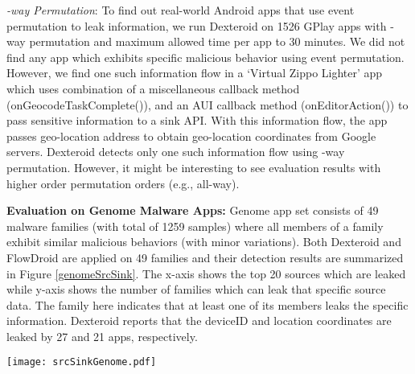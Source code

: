 \documentclass[10pt]{elsarticle}
\begin{document}
{\noindent \emph{-way Permutation}:} To find out real-world Android apps that use event permutation to leak information, we run Dexteroid on 1526 GPlay apps with -way permutation and maximum allowed time per app to 30 minutes. We did not find any app which exhibits specific malicious behavior using event permutation. However, we find one such information flow in a `Virtual Zippo Lighter' app which uses combination of a miscellaneous callback method ({\ttfamily onGeocodeTaskComplete()}), and an AUI callback method ({\ttfamily onEditorAction()}) to pass sensitive information to a sink API. With this information flow, the app passes geo-location address to obtain geo-location coordinates from Google servers. Dexteroid detects only one such information flow using -way permutation. However, it might be interesting to see evaluation results with higher order permutation orders (e.g., all-way). 


{\noindent \bf Evaluation on Genome Malware Apps:} Genome app set \cite{dissectingAndroid} consists of 49 malware families (with total of 1259 samples) where all members of a family exhibit similar malicious behaviors (with minor variations). Both Dexteroid and FlowDroid are applied on 49 families and their detection results are summarized in Figure \ref{genomeSrcSink}. The x-axis shows the top 20 sources which are leaked while y-axis shows the number of families which can leak that specific source data. The family here indicates that at least one of its members leaks the specific information. Dexteroid reports that the deviceID and location coordinates are leaked by 27 and 21 apps, respectively.


\begin{figure*}[ht]
\centering
\texttt{[image: srcSinkGenome.pdf]}
\caption{Information Leakage Detection by Dexteroid and FlowDroid in 49 Genome Families}
\label{genomeSrcSink}
\end{figure*}
\end{document}
